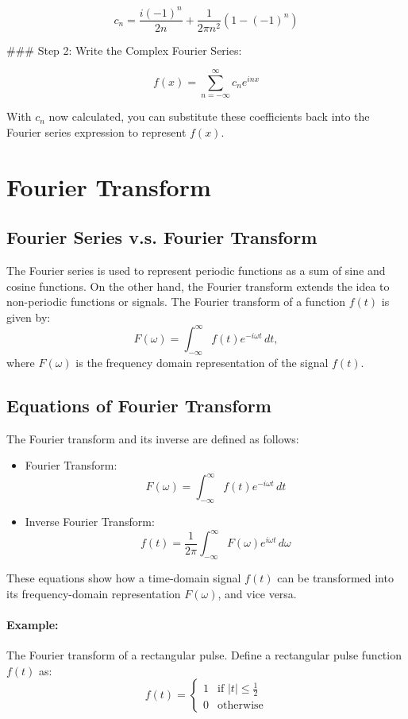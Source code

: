 \[ c_n = \frac{i(-1)^n}{2n} + \frac{1}{2\pi n^2} (1 - (-1)^n) \]

### Step 2: Write the Complex Fourier Series:

\[ f(x) = \sum_{n=-\infty}^{\infty} c_n e^{inx} \]

With \( c_n \) now calculated, you can substitute these coefficients back into the Fourier series expression to represent \( f(x) \).

\section{Fourier Transform}
\label{sec:fourier_transform}

\subsection{Fourier Series v.s. Fourier Transform}

The Fourier series is used to represent periodic functions as a sum of sine and cosine functions. On the other hand, the Fourier transform extends the idea to non-periodic functions or signals. The Fourier transform of a function \( f(t) \) is given by:
\[ F(\omega) = \int_{-\infty}^{\infty} f(t) e^{-i \omega t} \, dt, \]
where \( F(\omega) \) is the frequency domain representation of the signal \( f(t) \).

\subsection{Equations of Fourier Transform}
The Fourier transform and its inverse are defined as follows:
\begin{itemize}
	\item Fourier Transform:
	\[ F(\omega) = \int_{-\infty}^{\infty} f(t) e^{-i \omega t} \, dt \]
	\item Inverse Fourier Transform:
	\[ f(t) = \frac{1}{2\pi} \int_{-\infty}^{\infty} F(\omega) e^{i \omega t} \, d\omega \]
\end{itemize}
These equations show how a time-domain signal \( f(t) \) can be transformed into its frequency-domain representation \( F(\omega) \), and vice versa.

\paragraph{Example: }The Fourier transform of a rectangular pulse.
Define a rectangular pulse function \( f(t) \) as:
\[ f(t) = \begin{cases} 
1 & \text{if } |t| \leq \frac{1}{2} \\
0 & \text{otherwise} 
\end{cases} \]

